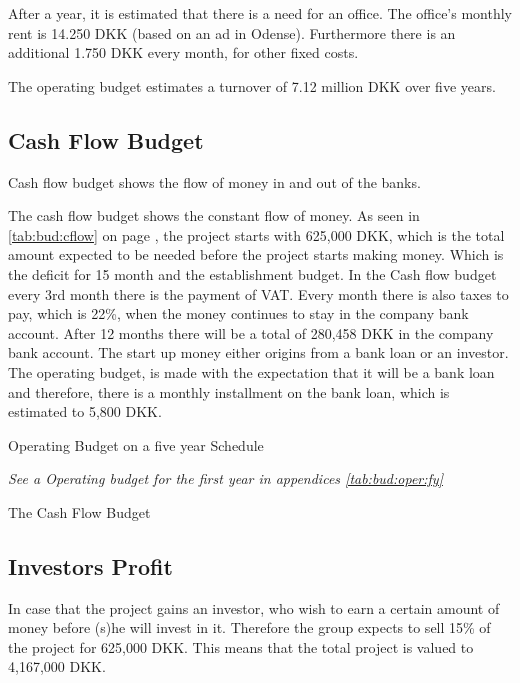 After a year, it is estimated that there is a need for an office. The office’s monthly rent is 14.250 DKK (based on an ad in Odense). Furthermore there is an additional 1.750 DKK every month, for other fixed costs. 

The operating budget estimates a turnover of 7.12 million DKK over five years. 

\subsection{Cash Flow Budget}
Cash flow budget shows the flow of money in and out of the banks.

The cash flow budget shows the constant flow of money. As seen in \autoref{tab:bud:cflow} on page \pageref{tab:bud:cflow}, the project starts with 625,000 DKK, which is the total amount expected to be needed before the project starts making money. Which is the deficit for 15 month and the establishment budget. In the Cash flow budget every 3rd month there is the payment of VAT. Every month there is also taxes to pay, which is 22\%, when the money continues to stay in the company bank account. After 12 months there will be a total of 280,458 DKK in the company bank account. The start up money either origins from a bank loan or an investor. The operating budget, is made with the expectation that it will be a bank loan and therefore, there is a monthly installment on the bank loan, which is estimated to 5,800 DKK.

\begin{table}[H]
\centering
\caption{Operating Budget on a five year Schedule}
\label{tab:bud:oper}

\textit{See a Operating budget for the first year in appendices \ref{tab:bud:oper:fy}}
\end{table}


\begin{table*}[t!]

\centering
\caption{The Cash Flow Budget}
\label{tab:bud:cflow}


\end{table*}

\clearpage

\subsection{Investors Profit}
In case that the project gains an investor, who wish to earn a certain amount of money before (s)he will invest in it. Therefore the group expects to sell 15\% of the project for 625,000 DKK. This means that the total project is valued to 4,167,000 DKK. 

